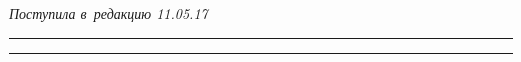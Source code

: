 \vspace*{-3pt}





\hfill{\small\textit{Поступила в~редакцию 11.05.17}}














\vspace*{12pt}





\hrule





\vspace*{3pt}















\hrule





\vspace*{6pt}











\def\tit{EFFECTIVE BANDWIDTH ESTIMATION\\ OF~HIGHLY RESPONSIBLE SYSTEMS\\ 


BY~THE~RANDOMIZED BATCH MEAN METHOD}





\def\titkol{Effective bandwidth estimation of~highly responsible systems 


by~the~randomized %


method}








\def\aut{K.\,A.~Kalinina$^1$ and~E.\,V.~Morozov$^{1,2}$}


\def\autkol{K.\,A.~Kalinina and~E.\,V.~Morozov}











